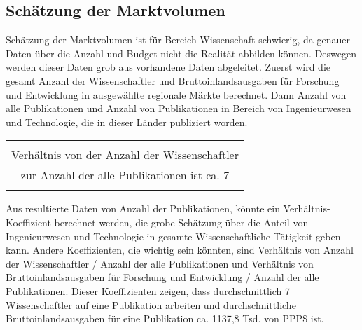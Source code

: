 \subsection{Schätzung der Marktvolumen}
Schätzung der Marktvolumen ist für Bereich Wissenschaft schwierig, da genauer Daten über die Anzahl und Budget nicht die Realität abbilden können. Deswegen werden dieser Daten grob aus vorhandene Daten abgeleitet. Zuerst wird die gesamt Anzahl der Wissenschaftler und Bruttoinlandsausgaben für Forschung und Entwicklung in ausgewählte regionale Märkte berechnet. Dann Anzahl von alle Publikationen und Anzahl von Publikationen in Bereich von Ingenieurwesen und Technologie, die in dieser Länder publiziert worden. 
\begin{table}[h!]
  \centering
  \begin{large}
  \begin{tabular}{c}\hline
  \\
  {\color{orange}Verhältnis von der Anzahl der Wissenschaftler}\\
  {\color{orange}zur Anzahl der alle Publikationen ist ca. 7}\\
  \\\hline
  \end{tabular}
  \end{large}
\end{table}
Aus resultierte Daten von Anzahl der Publikationen, könnte ein Verhältnis-Koeffizient berechnet werden, die grobe Schätzung über die Anteil von Ingenieurwesen und Technologie in gesamte Wissenschaftliche Tätigkeit geben kann. Andere Koeffizienten, die wichtig sein könnten, sind Verhältnis von Anzahl der Wissenschaftler / Anzahl der alle Publikationen und Verhältnis von Bruttoinlandsausgaben für Forschung und Entwicklung / Anzahl der alle Publikationen. Dieser Koeffizienten zeigen, dass durchschnittlich 7 Wissenschaftler auf eine Publikation arbeiten und durchschnittliche Bruttoinlandsausgaben für eine Publikation ca. 1137,8 Tsd. von PPP\$ ist.
